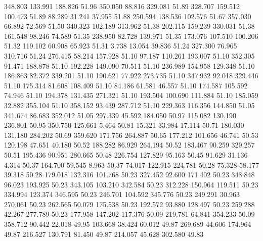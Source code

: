  348.803  133.991  188.826        51.96
 350.050   88.816  329.081        51.89
 328.707  159.512  100.473        51.89
  88.289   31.241   37.955        51.88
 250.594  138.536  102.576        51.67
 357.030   66.892   72.569        51.50
 340.323  102.189  313.962        51.38
 202.115  159.239  330.031        51.38
 161.548   98.246   74.589        51.35
 238.950   82.728  139.971        51.35
 173.076  107.510  100.206        51.32
 119.102   60.908   65.923        51.31
   3.738   13.054   39.836        51.24
 327.300   76.965  310.716        51.24
 276.415   58.214  157.928        51.10
  97.187  110.261  193.007        51.10
 352.305   91.471  188.878        51.10
 192.228  149.090   70.511        51.10
 236.989  154.958  129.348        51.10
 186.863   82.372  339.201        51.10
 190.621   77.922  273.735        51.10
 347.932   92.018  329.446        51.10
 175.314   81.608  108.409        51.10
  84.186   61.581   46.557        51.10
 174.587  105.592   74.946        51.10
 194.378  131.435  271.321        51.10
 193.504  100.690  111.884        51.10
 185.059   32.882  355.104        51.10
 358.152   93.439  287.712        51.10
 229.363  116.356  144.850        51.05
 341.674   86.683  352.012        51.05
 297.339   45.592  184.050        50.97
 115.082  130.190  236.801        50.95
 350.750  125.661    5.464        50.81
  15.321   33.984   17.114        50.71
 180.030  131.180  284.202        50.69
 359.620  171.756  264.887        50.65
 177.212  101.656   46.741        50.53
 120.198   47.651   40.180        50.52
 188.282   86.929  264.194        50.52
 183.467   90.259  329.257        50.51
 195.436   90.951  280.665        50.48
 226.754  127.829   95.163        50.45
  91.629   31.136    4.314        50.37
 164.700   59.545    8.963        50.37
  74.017  122.915  224.781        50.28
  75.328   58.177   39.318        50.28
 179.018  132.316  101.768        50.23
 327.452   92.600  171.402        50.23
 348.848   96.023  193.925        50.23
 343.105  103.210  342.584        50.23
 312.228  150.964  119.511        50.23
 334.994  123.374  346.595        50.23
 246.701  104.592  345.776        50.23
 249.291   30.963  270.061        50.23
 262.565   50.079  175.538        50.23
 192.572   93.880  128.497        50.23
 259.288   42.267  277.789        50.23
 177.958  147.202  117.376        50.09
 219.781   64.841  354.233        50.09
 358.712   90.442   22.018        49.95
 103.668   38.424   60.012        49.87
 269.689   44.606  174.964        49.87
 216.527  130.791   81.450        49.87
 214.057   45.628  302.580        49.83
